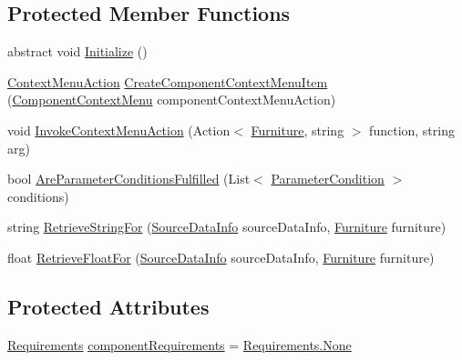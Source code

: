 \subsection*{Protected Member Functions}
\begin{DoxyCompactItemize}
\item 
abstract void \hyperlink{class_project_porcupine_1_1_buildable_1_1_components_1_1_buildable_component_ac3050db5e9d240e7618ce156920a9dc6}{Initialize} ()
\item 
\hyperlink{class_context_menu_action}{Context\+Menu\+Action} \hyperlink{class_project_porcupine_1_1_buildable_1_1_components_1_1_buildable_component_af66e467d15e1d8a11bbda57e1e4a4be5}{Create\+Component\+Context\+Menu\+Item} (\hyperlink{class_component_context_menu}{Component\+Context\+Menu} component\+Context\+Menu\+Action)
\item 
void \hyperlink{class_project_porcupine_1_1_buildable_1_1_components_1_1_buildable_component_aa96114c3fece4e34d5d088d3966d098a}{Invoke\+Context\+Menu\+Action} (Action$<$ \hyperlink{class_furniture}{Furniture}, string $>$ function, string arg)
\item 
bool \hyperlink{class_project_porcupine_1_1_buildable_1_1_components_1_1_buildable_component_ac7250f55e7d48d6ac1f1dc2258320a8c}{Are\+Parameter\+Conditions\+Fulfilled} (List$<$ \hyperlink{class_project_porcupine_1_1_buildable_1_1_components_1_1_buildable_component_1_1_parameter_condition}{Parameter\+Condition} $>$ conditions)
\item 
string \hyperlink{class_project_porcupine_1_1_buildable_1_1_components_1_1_buildable_component_a255b41979e606cf16e7d6fec11f8c6bd}{Retrieve\+String\+For} (\hyperlink{class_project_porcupine_1_1_buildable_1_1_components_1_1_buildable_component_1_1_source_data_info}{Source\+Data\+Info} source\+Data\+Info, \hyperlink{class_furniture}{Furniture} furniture)
\item 
float \hyperlink{class_project_porcupine_1_1_buildable_1_1_components_1_1_buildable_component_ad37f9b655dc234ca2154686c39cc455e}{Retrieve\+Float\+For} (\hyperlink{class_project_porcupine_1_1_buildable_1_1_components_1_1_buildable_component_1_1_source_data_info}{Source\+Data\+Info} source\+Data\+Info, \hyperlink{class_furniture}{Furniture} furniture)
\end{DoxyCompactItemize}
\subsection*{Protected Attributes}
\begin{DoxyCompactItemize}
\item 
\hyperlink{class_project_porcupine_1_1_buildable_1_1_components_1_1_buildable_component_a331a0d67512b8b402c04c8cf31c0ca8a}{Requirements} \hyperlink{class_project_porcupine_1_1_buildable_1_1_components_1_1_buildable_component_a16e8af5b3219d1ca0bd9fff7851b9fa4}{component\+Requirements} = \hyperlink{class_project_porcupine_1_1_buildable_1_1_components_1_1_buildable_component_a331a0d67512b8b402c04c8cf31c0ca8aa6adf97f83acf6453d4a6a4b1070f3754}{Requirements.\+None}
\end{DoxyCompactItemize}
